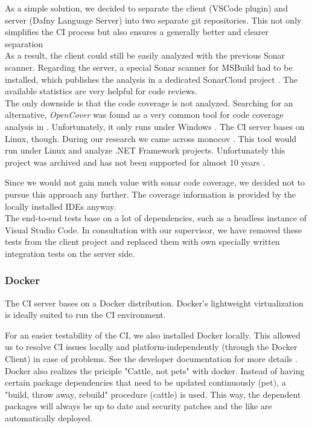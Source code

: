 As a simple solution, we decided to separate the client (VSCode plugin) and server (Dafny Language Server) into two separate git repositories.
This not only simplifies the CI process but also ensures a generally better and clearer separation \\

As a result, the client could still be easily analyzed with the previous Sonar scanner.
Regarding the server, a special Sonar scanner for MSBuild had to be installed, which publishes the analysis in a dedicated SonarCloud project \cite{dev}.
The available statistics are very helpful for code reviews.\\

The only downside is that the code coverage is not analyzed.
Searching for an alternative, \textit{OpenCover} was found as a very common tool for code coverage analysis in \Csharp.
Unfortunately, it only runs under Windows  \cite{opencover}.
The CI server bases on Linux, though.
During our research we came across monocov \cite{monocov}.
This tool would run under Linux and analyze .NET Framework projects.
Unfortunately this project was archived and has not been supported for almost 10 years \cite{monocov}.

Since we would not gain much value with sonar code coverage, we decided not to pursue this approach any further.
The coverage information is provided by the locally installed IDEs anyway.\\

The end-to-end tests base on a lot of dependencies, such as a headless instance of Visual Studio Code.
In consultation with our supervisor, we have removed these tests from the client project and replaced them with own specially written integration tests on the server side.

\subsubsection{Docker}
The CI server bases on a Docker distribution.
Docker's lightweight virtualization is ideally suited to run the CI environment.

For an easier testability of the CI, we also installed Docker locally.
This allowed us to resolve CI issues locally and platform-independently (through the Docker Client) in case of problems.
See the developer documentation for more details \cite{dev}.\\

Docker also realizes the priciple "Cattle, not pets" with docker.  
Instead of having certain package dependencies that need to be updated continuously (pet), a "build, throw away, rebuild" procedure (cattle) is used. This way, the dependent packages will always be up to date and security patches and the like are automatically deployed. \\

